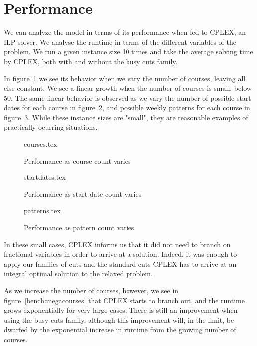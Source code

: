 \newpage
\section{Performance}

We can analyze the model in terms of its performance when fed to CPLEX, an ILP solver. We analyse the runtime in terms of the different variables of the problem. We run a given instance size 10 times and take the average solving time by CPLEX, both with and without the busy cuts family.

In figure~\ref{bench:courses} we see its behavior when we vary the number of courses, leaving all else constant. We see a linear growth when the number of courses is small, below 50. The same linear behavior is observed as we vary the number of possible start dates for each course in figure~\ref{bench:startdates}, and possible weekly patterns for each course in figure~\ref{bench:patterns}. While these instance sizes are "small", they are reasonable examples of practically ocurring situations.

\begin{figure}
\begin{center}
{courses.tex}
\caption{Performance as course count varies}
\label{bench:courses}
\end{center}
\end{figure}

\begin{figure}
\begin{center}
{startdates.tex}
\caption{Performance as start date count varies}
\label{bench:startdates}
\end{center}
\end{figure}

\begin{figure}
\begin{center}
{patterns.tex}
\caption{Performance as pattern count varies}
\label{bench:patterns}
\end{center}
\end{figure}

In these small cases, CPLEX informs us that it did not need to branch on fractional variables in order to arrive at a solution. Indeed, it was enough to apply our families of cuts and the standard cuts CPLEX has to arrive at an integral optimal solution to the relaxed problem.

As we increase the number of courses, however, we see in figure~\ref{bench:megacourses} that CPLEX starts to branch out, and the runtime grows exponentially for very large cases. There is still an improvement when using the busy cuts family, although this improvement will, in the limit, be dwarfed by the exponential increase in runtime from the growing number of courses.

